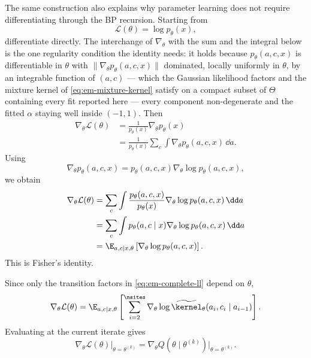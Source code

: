 The same construction also explains why parameter learning does not require
differentiating through the BP recursion. Starting from
\begin{equation}
  \mathcal L(\theta)
  =
  \log p_\theta(x),
\end{equation}
differentiate directly. The interchange of $\nabla_\theta$ with the sum and
the integral below is the one regularity condition the identity needs: it holds
because $p_\theta(a,c,x)$ is differentiable in $\theta$ with
$\|\nabla_\theta p_\theta(a,c,x)\|$ dominated, locally uniformly in
$\theta$, by an integrable function of $(a,c)$ --- which the Gaussian
likelihood factors and the mixture kernel of \eqref{eq:em-mixture-kernel}
satisfy on a compact subset of $\Theta$ containing every fit reported here ---
every component non-degenerate and the fitted $\alpha$ staying well inside
$(-1,1)$. Then
\begin{align}
  \nabla_\theta\mathcal L(\theta)
  &=
  \frac{1}{p_\theta(x)}
  \nabla_\theta p_\theta(x)
  \nonumber\\
  &=
  \frac{1}{p_\theta(x)}
  \sum_c
  \int
  \nabla_\theta p_\theta(a,c,x)\,\dd a.
  \label{eq:em-fisher-step1}
\end{align}
Using
\begin{equation}
  \nabla_\theta p_\theta(a,c,x)
  =
  p_\theta(a,c,x)
  \nabla_\theta\log p_\theta(a,c,x),
\end{equation}
we obtain
\begin{align}
  \nabla_\theta\mathcal L(\theta)
  &=
  \sum_c
  \int
  \frac{p_\theta(a,c,x)}{p_\theta(x)}
  \nabla_\theta
  \log p_\theta(a,c,x)\,\dd a
  \nonumber\\
  &=
  \sum_c
  \int
  p_\theta(a,c\mid x)
  \nabla_\theta
  \log p_\theta(a,c,x)\,\dd a
  \nonumber\\
  &=
  \E_{a,c\mid x,\theta}
  \left[
    \nabla_\theta
    \log p_\theta(a,c,x)
  \right].
  \label{eq:em-fisher-general}
\end{align}
This is Fisher's identity.

Since only the transition factors in
\eqref{eq:em-complete-ll} depend on $\theta$,
\begin{equation}
  \nabla_\theta\mathcal L(\theta)
  =
  \E_{a,c\mid x,\theta}
  \left[
    \sum_{i=2}^{\nsites}
    \nabla_\theta
    \log
    \widetilde\kernel_\theta
    (a_i,c_i\mid a_{i-1})
  \right].
  \label{eq:em-fisher}
\end{equation}
Evaluating at the current iterate gives
\begin{equation}
  \nabla_\theta\mathcal L(\theta)
  \Big|_{\theta=\theta^{(k)}}
  =
  \nabla_\theta
  Q(\theta\mid\theta^{(k)})
  \Big|_{\theta=\theta^{(k)}}.
  \label{eq:em-fisher-Q}
\end{equation}

